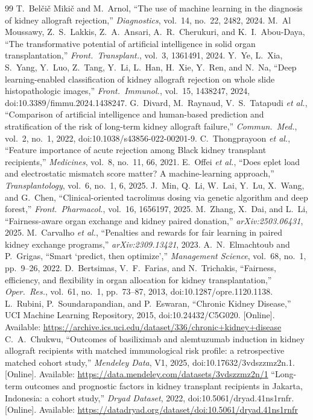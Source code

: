 \documentclass[journal]{IEEEtran}
\begin{document}
\begin{thebibliography}{99}
 T.\ Bel\v{c}i\v{c} Miki\v{c} and M.\ Arnol, ``The use of machine learning in the diagnosis of kidney allograft rejection,'' \textit{Diagnostics}, vol.\ 14, no.\ 22, 2482, 2024.
 M.\ Al Moussawy, Z.\ S.\ Lakkis, Z.\ A.\ Ansari, A.\ R.\ Cherukuri, and K.\ I.\ Abou-Daya, ``The transformative potential of artificial intelligence in solid organ transplantation,'' \textit{Front.\ Transplant.}, vol.\ 3, 1361491, 2024.
 Y.\ Ye, L.\ Xia, S.\ Yang, Y.\ Luo, Z.\ Tang, Y.\ Li, L.\ Han, H.\ Xie, Y.\ Ren, and N.\ Na, ``Deep learning-enabled classification of kidney allograft rejection on whole slide histopathologic images,'' \textit{Front.\ Immunol.}, vol.\ 15, 1438247, 2024, doi:10.3389/fimmu.2024.1438247.
 G.\ Divard, M.\ Raynaud, V.\ S.\ Tatapudi \textit{et al.}, ``Comparison of artificial intelligence and human-based prediction and stratification of the risk of long-term kidney allograft failure,'' \textit{Commun.\ Med.}, vol.\ 2, no.\ 1, 2022, doi:10.1038/s43856-022-00201-9.
 C.\ Thongprayoon \textit{et al.}, ``Feature importance of acute rejection among Black kidney transplant recipients,'' \textit{Medicines}, vol.\ 8, no.\ 11, 66, 2021.
 E.\ Offei \textit{et al.}, ``Does eplet load and electrostatic mismatch score matter? A machine-learning approach,'' \textit{Transplantology}, vol.\ 6, no.\ 1, 6, 2025.
 J.\ Min, Q.\ Li, W.\ Lai, Y.\ Lu, X.\ Wang, and G.\ Chen, ``Clinical-oriented tacrolimus dosing via genetic algorithm and deep forest,'' \textit{Front.\ Pharmacol.}, vol.\ 16, 1656197, 2025.
 M.\ Zhang, X.\ Dai, and L.\ Li, ``Fairness-aware organ exchange and kidney paired donation,'' \textit{arXiv:2503.06431}, 2025.
 M.\ Carvalho \textit{et al.}, ``Penalties and rewards for fair learning in paired kidney exchange programs,'' \textit{arXiv:2309.13421}, 2023.
 A.\ N.\ Elmachtoub and P.\ Grigas, ``Smart `predict, then optimize','' \textit{Management Science}, vol.\ 68, no.\ 1, pp.\ 9--26, 2022.
 D.\ Bertsimas, V.\ F.\ Farias, and N.\ Trichakis, ``Fairness, efficiency, and flexibility in organ allocation for kidney transplantation,'' \textit{Oper.\ Res.}, vol.\ 61, no.\ 1, pp.\ 73--87, 2013, doi:10.1287/opre.1120.1138.
 L.\ Rubini, P.\ Soundarapandian, and P.\ Eswaran, ``Chronic Kidney Disease,'' UCI Machine Learning Repository, 2015, doi:10.24432/C5G020. [Online]. Available: \url{https://archive.ics.uci.edu/dataset/336/chronic+kidney+disease}
 C.\ A.\ Chukwu, ``Outcomes of basiliximab and alemtuzumab induction in kidney allograft recipients with matched immunological risk profile: a retrospective matched cohort study,'' \textit{Mendeley Data}, V1, 2025, doi:10.17632/3vdszzmz2n.1. [Online]. Available: \url{https://data.mendeley.com/datasets/3vdszzmz2n/1}
 ``Long-term outcomes and prognostic factors in kidney transplant recipients in Jakarta, Indonesia: a cohort study,'' \textit{Dryad Dataset}, 2022, doi:10.5061/dryad.41ns1rnfr. [Online]. Available: \url{https://datadryad.org/dataset/doi:10.5061/dryad.41ns1rnfr}
\end{thebibliography}
\end{document}
